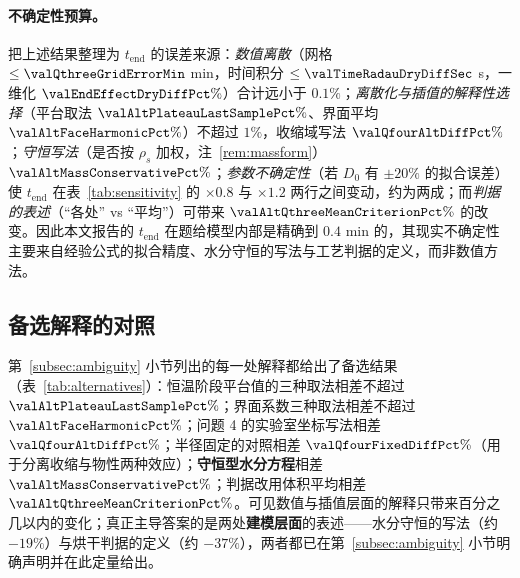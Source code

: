 \paragraph{不确定性预算。} 把上述结果整理为 $t_{\mathrm{end}}$ 的误差来源：\emph{数值离散}（网格 $\le\valQthreeGridErrorMin$ \si{\minute}，时间积分 $\le\valTimeRadauDryDiffSec$ \si{\second}，一维化 $\valEndEffectDryDiffPct\%$）合计远小于 $0.1\%$；\emph{离散化与插值的解释性选择}（平台取法 $\valAltPlateauLastSamplePct\%$、界面平均 $\valAltFaceHarmonicPct\%$）不超过 $1\%$，收缩域写法 $\valQfourAltDiffPct\%$；\emph{守恒写法}（是否按 $\rho_s$ 加权，注~\ref{rem:massform}）$\valAltMassConservativePct\%$；\emph{参数不确定性}（若 $D_0$ 有 $\pm20\%$ 的拟合误差）使 $t_{\mathrm{end}}$ 在表~\ref{tab:sensitivity} 的 $\times0.8$ 与 $\times1.2$ 两行之间变动，约为两成；而\emph{判据的表述}（“各处” vs “平均”）可带来 $\valAltQthreeMeanCriterionPct\%$ 的改变。因此本文报告的 $t_{\mathrm{end}}$ 在题给模型内部是精确到 $0.4$ \si{\minute} 的，其现实不确定性主要来自经验公式的拟合精度、水分守恒的写法与工艺判据的定义，而非数值方法。

\subsection{备选解释的对照}
\label{subsec:alternatives}

第~\ref{subsec:ambiguity} 小节列出的每一处解释都给出了备选结果（表~\ref{tab:alternatives}）：恒温阶段平台值的三种取法相差不超过 $\valAltPlateauLastSamplePct\%$；界面系数三种取法相差不超过 $\valAltFaceHarmonicPct\%$；问题 4 的实验室坐标写法相差 $\valQfourAltDiffPct\%$；半径固定的对照相差 $\valQfourFixedDiffPct\%$（用于分离收缩与物性两种效应）；\textbf{守恒型水分方程}相差 $\valAltMassConservativePct\%$；判据改用体积平均相差 $\valAltQthreeMeanCriterionPct\%$。可见数值与插值层面的解释只带来百分之几以内的变化；真正主导答案的是两处\textbf{建模层面}的表述——水分守恒的写法（约 $-19\%$）与烘干判据的定义（约 $-37\%$），两者都已在第~\ref{subsec:ambiguity} 小节明确声明并在此定量给出。


